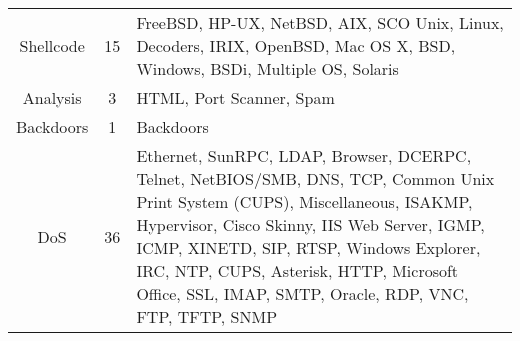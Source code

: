 \begin{table}[htbp]
\begin{tabularx}{\textwidth}{@{}ccX@{}}
		Shellcode                         & 15                                & FreeBSD, HP-UX, NetBSD, AIX, SCO Unix, Linux, Decoders, IRIX, OpenBSD, Mac OS X, BSD, Windows, BSDi, Multiple OS, Solaris                                                                                                                                                                                                                                                                                                                                                                                                                                           \\
		Analysis                          & 3                                 & HTML, Port Scanner, Spam                                                                                                                                                                                                                                                                                                                                                                                                                                                                                                                                            \\
		Backdoors                         & 1                                 & Backdoors                                                                                                                                                                                                                                                                                                                                                                                                                                                                                                                                                           \\
		DoS                               & 36                                & Ethernet, SunRPC, LDAP, Browser, DCERPC, Telnet, NetBIOS/SMB, DNS, TCP, Common Unix Print System (CUPS), Miscellaneous, ISAKMP, Hypervisor,
		Cisco Skinny, IIS Web Server, IGMP, ICMP, XINETD, SIP, RTSP, Windows Explorer, IRC, NTP, CUPS, Asterisk, HTTP, Microsoft Office, SSL, IMAP, SMTP, Oracle, RDP, VNC, FTP, TFTP, SNMP                                                                                                                                                                                                                                                                                                                                                                                                                                                         \\

\end{tabularx}
\end{table}
